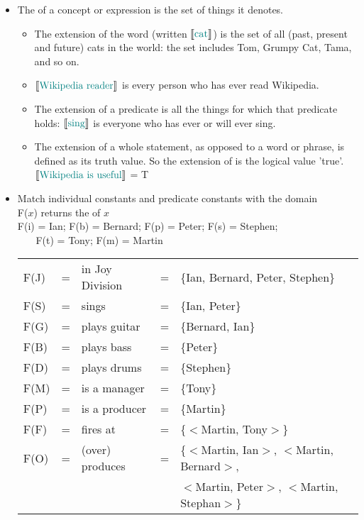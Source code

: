\documentclass[headrule,footrule]{foils}
\newcommand{\den}[2][]{\ensuremath{\llbracket\textnormal{\textcolor{teal}{#2}}\rrbracket^{\ensuremath{#1}}}}
\begin{document}
\begin{itemize}
\item The  of a concept or expression is the set of things it denotes.
  \begin{itemize}
  \item The extension of the word  (written \den{cat}) is the
    set of all (past, present and future) cats in the world: the set
    includes Tom, Grumpy Cat, Tama,  and so on.
  \item \den{Wikipedia reader} is every person who has ever read Wikipedia.
  \item The extension of a predicate is all the things for which that predicate holds:
    \den{sing} is everyone who has ever or will ever sing.
  \item The extension of a whole statement, as opposed to a word or
    phrase, is defined as its truth value. So the extension of
     is the logical value 'true'.
    \\ \den{Wikipedia is useful} = T
  \end{itemize}
\end{itemize}





\begin{itemize}
\item Match individual constants and predicate constants with the domain
\\ F($x$) returns the  of $x$
    \\ F(i) = Ian; F(b) = Bernard; F(p) = Peter; F(s) = Stephen; 
     \\ ~~~ F(t) = Tony;  F(m) = Martin
 \\ \begin{tabular}{lllll}
      F(J) & = & in Joy Division & = & \{Ian, Bernard, Peter, Stephen\} \\
      F(S) & = & sings & = & \{Ian, Peter\} \\      
      F(G) & = & plays guitar & = & \{Bernard, Ian\} \\
      F(B) & = & plays bass & = & \{Peter\} \\
      F(D) & = & plays drums & = & \{Stephen\} \\
      F(M) & = & is a manager & = & \{Tony\} \\
      F(P) & = & is a producer & = & \{Martin\} \\
      F(F) & = & fires at & = & \{$<$Martin, Tony$>$\} \\
      F(O) & = & (over) produces & = & \{$<$Martin, Ian$>$, $<$Martin, Bernard$>$, \\
      &&&&  $<$Martin, Peter$>$, $<$Martin, Stephan$>$\} \\
    \end{tabular}
\end{itemize}
\end{document}
